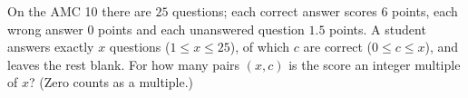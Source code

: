 On the AMC 10 there are $25$ questions; each correct answer scores $6$ points, each wrong answer $0$ points and each unanswered question $1.5$ points. A student answers exactly $x$ questions ($1\le x\le25$), of which $c$ are correct ($0\le c\le x$), and leaves the rest blank. For how many pairs $(x,c)$ is the score an integer multiple of $x$? (Zero counts as a multiple.)
